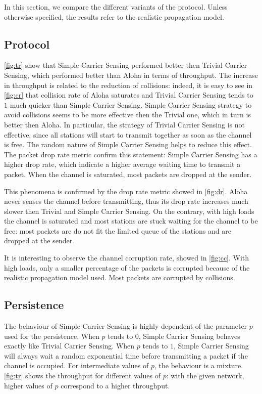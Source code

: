 In this section, we compare the different variants of the protocol.
Unless otherwise specified, the results refer to the realistic propagation model.

\subsection{Protocol}
\cref{fig:tr} show that Simple Carrier Sensing performed better then Trivial Carrier Sensing, which performed better than Aloha in terms of throughput.
The increase in throughput is related to the reduction of collisions: indeed, it is easy to see in \cref{fig:cr}  that collision rate of Aloha saturates and Trivial Carrier Sensing tends to $1$ much quicker than Simple Carrier Sensing.
Simple Carrier Sensing strategy to avoid collisions seems to be more effective then the Trivial one, which in turn is better then Aloha.
In particular, the strategy of Trivial Carrier Sensing is not effective, since all stations will start to transmit together as soon as the channel is free.
The random nature of Simple Carrier Sensing helps to reduce this effect.
The packet drop rate metric confirm this statement: Simple Carrier Sensing has a higher drop rate, which indicate a higher average waiting time to transmit a packet.
When the channel is saturated, most packets are dropped at the sender.


This phenomena is confirmed by the drop rate metric showed in \cref{fig:dr}.
Aloha never senses the channel before transmitting, thus its drop rate increases much slower then Trivial and Simple Carrier Sensing.
On the contrary, with high loads the channel is saturated and most stations are stuck waiting for the channel to be free: most packets are do not fit the limited queue of the stations and are dropped at the sender.

It is interesting to observe the channel corruption rate, showed in \cref{fig:cc}.
With high loads, only a smaller percentage of the packets is corrupted because of the realistic propagation model used.
Most packets are corrupted by collisions.


\subsection{Persistence}
The behaviour of Simple Carrier Sensing is highly dependent of the parameter $p$ used for the persistence.
When $p$ tends to $0$, Simple Carrier Sensing behaves exactly like Trivial Carrier Sensing.
When $p$ tends to $1$, Simple Carrier Sensing will always wait a random exponential time before transmitting a packet if the channel is occupied.
For intermediate values of $p$, the behaviour is a mixture.
\cref{fig:tr} shows the throughput for different values of $p$: with the given network, higher values of $p$ correspond to a higher throughput.


